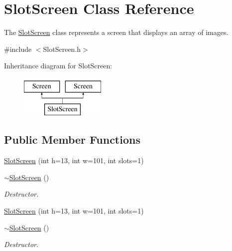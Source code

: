 \hypertarget{classSlotScreen}{\section{Slot\-Screen Class Reference}
\label{classSlotScreen}
}


The \hyperlink{classSlotScreen}{Slot\-Screen} class represents a screen that displays an array of images.  




{\ttfamily \#include $<$Slot\-Screen.\-h$>$}

Inheritance diagram for Slot\-Screen\-:\begin{figure}[H]
\begin{center}
\leavevmode
\includegraphics[height=2.000000cm]{classSlotScreen}
\end{center}
\end{figure}
\subsection*{Public Member Functions}
\begin{DoxyCompactItemize}
\item 
\hyperlink{classSlotScreen_a55b2a1537eb5cf4735f624e50946bc5a}{Slot\-Screen} (int h=13, int w=101, int slots=1)
\item 
\hypertarget{classSlotScreen_a1978a574c2835aeafd746ff3813c7253}{\hyperlink{classSlotScreen_a1978a574c2835aeafd746ff3813c7253}{$\sim$\-Slot\-Screen} ()}\label{classSlotScreen_a1978a574c2835aeafd746ff3813c7253}

\begin{DoxyCompactList}\small\item\em Destructor. \end{DoxyCompactList}\item 
\hyperlink{classSlotScreen_a55b2a1537eb5cf4735f624e50946bc5a}{Slot\-Screen} (int h=13, int w=101, int slots=1)
\item 
\hypertarget{classSlotScreen_a1978a574c2835aeafd746ff3813c7253}{\hyperlink{classSlotScreen_a1978a574c2835aeafd746ff3813c7253}{$\sim$\-Slot\-Screen} ()}\label{classSlotScreen_a1978a574c2835aeafd746ff3813c7253}

\begin{DoxyCompactList}\small\item\em Destructor. \end{DoxyCompactList}\end{DoxyCompactItemize}
